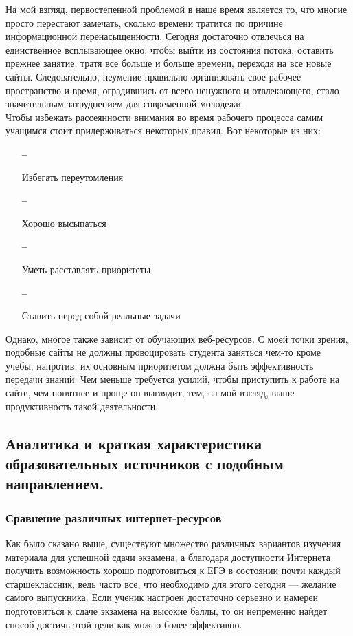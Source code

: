 \documentclass[a4paper, 12pt]{extarticle}
\begin{document}
На мой взгляд, первостепенной проблемой в наше время является то, что многие
просто перестают замечать, сколько времени тратится по причине информационной
перенасыщенности. Сегодня достаточно отвлечься на единственное всплывающее
окно, чтобы выйти из состояния потока, оставить прежнее занятие, тратя все
больше и больше времени, переходя на все новые сайты. Следовательно, неумение
правильно организовать свое рабочее пространство и время, оградившись от всего
ненужного и отвлекающего, стало значительным затруднением для современной
молодежи.
\\

Чтобы избежать рассеянности внимания во время рабочего процесса самим учащимся
стоит придерживаться некоторых правил. Вот некоторые из них:
\begin{itemize}
    \item[\bfseries--] {\small Избегать переутомления\par}
    \item[\bfseries--] {\small Хорошо высыпаться\par}
    \item[\bfseries--] {\small Уметь расставлять приоритеты\par}
    \item[\bfseries--] {\small Ставить перед собой реальные задачи\par}
\end{itemize}
Однако, многое также зависит от обучающих веб-ресурсов. С моей точки зрения,
подобные сайты не должны провоцировать студента заняться чем-то кроме учебы,
напротив, их основным приоритетом должна быть эффективность передачи знаний.
Чем меньше требуется усилий, чтобы приступить к работе на сайте, чем понятнее и
проще он выглядит, тем, на мой взгляд, выше продуктивность такой деятельности.
\newpage

\subsection{Аналитика и краткая характеристика образовательных источников с
подобным направлением.}
\subsubsection{Сравнение различных интернет-ресурсов}
Как было сказано выше, существуют множество различных вариантов изучения
материала для успешной сдачи экзамена, а благодаря доступности Интернета
получить возможность хорошо подготовиться к ЕГЭ в состоянии почти каждый
старшеклассник, ведь часто все, что необходимо для этого сегодня — желание
самого выпускника. Если ученик настроен достаточно серьезно и намерен
подготовиться к сдаче экзамена на высокие баллы, то он непременно найдет способ
достичь этой цели как можно более эффективно.
\\
\end{document}
